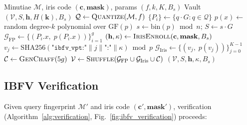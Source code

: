 \documentclass[3p,twocolumn]{elsarticle}
\newcommand{\IBFV}{\textsf{IBFV}}
\newcommand{\GFp}{\mathrm{GF}(p)}
\begin{document}
\begin{algorithm}[t]
\caption{\IBFV{} Enrollment}
\label{alg:enrollment}
\begin{algorithmic}[1]
\REQUIRE Minutiae $\mathcal{M}$, iris code $(\mathbf{c}, \mathbf{mask})$, params $(f, k, K, B_s)$
\ENSURE Vault $(\mathcal{V}, S, \mathbf{h}, H(\mathbf{k}), B_s)$
\STATE $\mathcal{Q} \leftarrow \textsc{Quantize}(\mathcal{M}, f)$
\STATE $\{P_i\} \leftarrow \{q \cdot G : q \in \mathcal{Q}\}$ 
\STATE $p(x) \leftarrow$ random degree-$k$ polynomial over $\GFp{}$
\STATE $s \leftarrow \text{bin}(p) \bmod n$; $S \leftarrow s \cdot G$
\STATE $\mathcal{G}_\text{FP} \leftarrow \{(P_i.x,\; p(P_i.x))\}_{i=1}^{g}$
\STATE $(\mathbf{h}, \kappa) \leftarrow \textsc{IrisEnroll}(\mathbf{c}, \mathbf{mask}, B_s)$
    \STATE $v_j \leftarrow \text{SHA256}(\texttt{"ibfv\_vpt:"} \| j \| \texttt{":"} \| \kappa) \bmod p$
\ENDFOR
\STATE $\mathcal{G}_\text{Iris} \leftarrow \{(v_j,\; p(v_j))\}_{j=0}^{K-1}$
\STATE $\mathcal{C} \leftarrow \textsc{GenChaff}(5g)$ 
\STATE $\mathcal{V} \leftarrow \textsc{Shuffle}(\mathcal{G}_\text{FP} \cup \mathcal{G}_\text{Iris} \cup \mathcal{C})$
\RETURN $(\mathcal{V}, S, \mathbf{h}, \kappa, B_s)$
\end{algorithmic}
\end{algorithm}

\subsection{IBFV Verification}
\label{sec:ibfv_verification}

Given query fingerprint $\mathcal{M}'$ and iris code $(\mathbf{c}', \mathbf{mask}')$, verification (Algorithm~\ref{alg:verification}, Fig.~\ref{fig:ibfv_verification}) proceeds:
\end{document}

